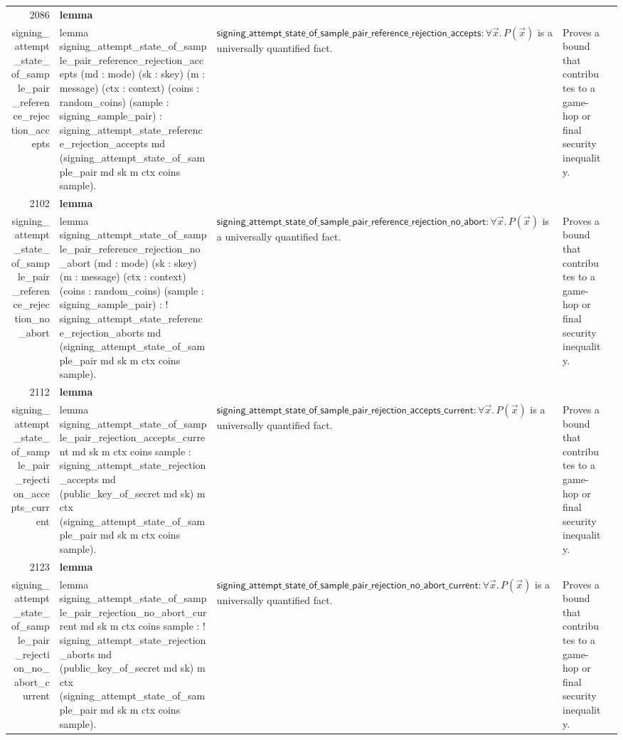 \documentclass[10pt]{article}
\newcommand{\ec}[1]{\begingroup\ttfamily\scriptsize #1\endgroup}
\begin{document}
\begin{longtable}{r L{0.17\textwidth} L{0.26\textwidth} L{0.27\textwidth} L{0.20\textwidth}}
2086 & \textbf{lemma}\\\ec{signing\_attempt\_state\_of\_sample\_pair\_reference\_rejection\_accepts} & \ec{lemma signing\_attempt\_state\_of\_sample\_pair\_reference\_rejection\_accepts (md : mode) (sk : skey) (m : message) (ctx : context) (coins : random\_coins) (sample : signing\_sample\_pair) : signing\_attempt\_state\_reference\_rejection\_accepts md (signing\_attempt\_state\_of\_sample\_pair md sk m ctx coins sample).} & \(\mathsf{signing\_attempt\_state\_of\_sample\_pair\_reference\_rejection\_accepts} : \forall \vec{x}.\, P(\vec{x})\) is a universally quantified fact. & Proves a bound that contributes to a game-hop or final security inequality. \\
2102 & \textbf{lemma}\\\ec{signing\_attempt\_state\_of\_sample\_pair\_reference\_rejection\_no\_abort} & \ec{lemma signing\_attempt\_state\_of\_sample\_pair\_reference\_rejection\_no\_abort (md : mode) (sk : skey) (m : message) (ctx : context) (coins : random\_coins) (sample : signing\_sample\_pair) : ! signing\_attempt\_state\_reference\_rejection\_aborts md (signing\_attempt\_state\_of\_sample\_pair md sk m ctx coins sample).} & \(\mathsf{signing\_attempt\_state\_of\_sample\_pair\_reference\_rejection\_no\_abort} : \forall \vec{x}.\, P(\vec{x})\) is a universally quantified fact. & Proves a bound that contributes to a game-hop or final security inequality. \\
2112 & \textbf{lemma}\\\ec{signing\_attempt\_state\_of\_sample\_pair\_rejection\_accepts\_current} & \ec{lemma signing\_attempt\_state\_of\_sample\_pair\_rejection\_accepts\_current md sk m ctx coins sample : signing\_attempt\_state\_rejection\_accepts md (public\_key\_of\_secret md sk) m ctx (signing\_attempt\_state\_of\_sample\_pair md sk m ctx coins sample).} & \(\mathsf{signing\_attempt\_state\_of\_sample\_pair\_rejection\_accepts\_current} : \forall \vec{x}.\, P(\vec{x})\) is a universally quantified fact. & Proves a bound that contributes to a game-hop or final security inequality. \\
2123 & \textbf{lemma}\\\ec{signing\_attempt\_state\_of\_sample\_pair\_rejection\_no\_abort\_current} & \ec{lemma signing\_attempt\_state\_of\_sample\_pair\_rejection\_no\_abort\_current md sk m ctx coins sample : ! signing\_attempt\_state\_rejection\_aborts md (public\_key\_of\_secret md sk) m ctx (signing\_attempt\_state\_of\_sample\_pair md sk m ctx coins sample).} & \(\mathsf{signing\_attempt\_state\_of\_sample\_pair\_rejection\_no\_abort\_current} : \forall \vec{x}.\, P(\vec{x})\) is a universally quantified fact. & Proves a bound that contributes to a game-hop or final security inequality. \\

\end{longtable}
\end{document}
